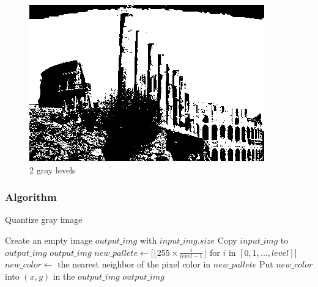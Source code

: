 \documentclass{article}
\begin{document}
\begin{figure}[H]
\centering
\includegraphics[width=288pt]{../result/quantize-2.png}
\caption{2 gray levels}
\label{quan2}
\end{figure}

\subsubsection{Algorithm}
\label{sec:quanalgo}
\begin{algorithm}[h]
\centering
\caption{Quantize gray image}
\label{alg:quan}
  \begin{algorithmic}[1]
      \State Create an empty image $output\_img$ with $input\_img.size$
      	\State Copy $input\_img$ to $output\_img$
      	\State \Return $output\_img$
      \EndIf
      \State $new\_pallete \gets [\lfloor255 \times \frac{i}{level-1}\rfloor$ for $i$ in $[0, 1, ..., level]$]
      	\State $new\_color \gets$ the nearest neighbor of the pixel color in $new\_pallete$
      	\State Put $new\_color$ into $(x, y)$ in the $output\_img$
      \EndFor
      \State \Return $output\_img$
    \EndFunction
  \end{algorithmic}
\end{algorithm}




\end{document}

